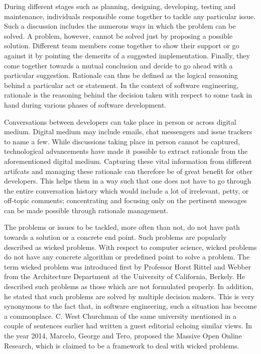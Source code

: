 \documentclass[a4paper,12pt,twoside]{report}
\begin{document}
During different stages such as planning, designing, developing, testing and maintenance, individuals responsible come together to tackle any particular issue. Such a discussion includes the numerous ways in which the problem can be solved. A problem, however, cannot be solved just by proposing a possible solution. Different team members come together to show their support or go against it by pointing the demerits of a suggested implementation. Finally, they come together towards a mutual conclusion and decide to go ahead with a particular suggestion. Rationale can thus be defined as the logical reasoning behind a particular act or statement. In the context of software engineering, rationale is the reasoning behind the decision taken with respect to some task in hand during various phases of software development. 

Conversations between developers can take place in person or across digital medium. Digital medium may include emails, chat messengers and issue trackers to name a few. While discussions taking place in person cannot be captured, technological advancements have made it possible to extract rationale from the aforementioned digital medium. Capturing these vital information from different artifcats and managing these rationale can therefore be of great benefit for other developers. This helps them in a way such that one does not have to go through the entire conversation history which would include a lot of irrelevant, petty, or off-topic comments; concentrating and focusing only on the pertinent messages can be made possible through rationale management. 

The problems or issues to be tackled, more often than not, do not have path towards a solution or a concrete end point. Such problems are popularly described as wicked problems. With respect to computer science, wicked problems do not have any concrete algorithm or predefined point to solve a problem. The term wicked problem was introduced first by Professor Horst Rittel and Webber from the Architecture Department at the University of California, Berkely. He described such problems as those which are not formulated properly. In addition, he stated that such problems are solved by multiple decision makers. This is very synonymous to the fact that, in software engineering, such a situation has become a commonplace. C. West Churchman of the same university mentioned in a couple of sentences earlier had written a guest editorial echoing similar views. In the year 2014, Marcelo, George and Tero, proposed the Massive Open Online Research, which is claimed to be a framework to deal with wicked problems. 
\end{document}
